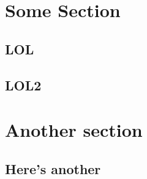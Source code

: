 \section{Some Section}
\subsection{LOL}
\lipsum
\subsection{LOL2}
\lipsum

\section{Another section}
\subsection{Here's another}
\citep{svoboda2012}
\lipsum
